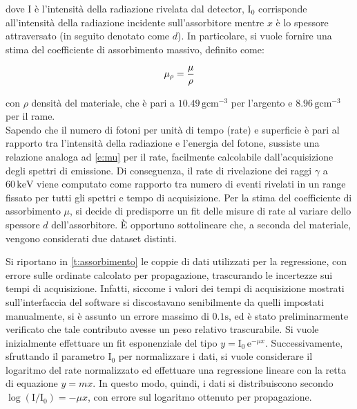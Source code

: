 \documentclass[twocolumn,10pt]{asme2ej}
\begin{document}
\noindent dove I è l'intensità della radiazione rivelata dal detector, $\text{I}_0$ corrisponde all'intensità della
radiazione incidente sull'assorbitore mentre $x$ è lo spessore attraversato (in seguito denotato come $d$). In
particolare, si vuole fornire una stima del coefficiente di assorbimento massivo, definito come:

\vspace{-15pt}
\begin{equation}
   \mu_{\rho} = \frac{\mu}{\rho}
    \vspace{-5pt}
    \label{e:mu_mass}
\end{equation}

con $\rho$ densità del materiale, che è pari a $10.49\,\si{\gram \centi\metre^{-3}}$ per l'argento e $8.96\,\si{\gram
\centi\metre^{-3}}$ per il rame. \\ 



Sapendo che il numero di fotoni per unità di tempo (rate) e superficie è pari al rapporto tra l'intensità della
radiazione e l'energia del fotone, sussiste una relazione analoga ad \autoref{e:mu} per il rate, facilmente calcolabile
dall'acquisizione degli spettri di emissione. Di conseguenza, il rate di rivelazione dei raggi $\gamma$ a
$60\,\si{\kilo\electronvolt}$ viene computato come rapporto tra numero di eventi rivelati in un range fissato per tutti
gli spettri e tempo di acquisizione. Per la stima del coefficiente di assorbimento $\mu$, si decide di predisporre un
fit delle misure di rate al variare dello spessore $d$ dell'assorbitore. È opportuno sottolineare che, a seconda del
materiale, vengono considerati due dataset distinti. 


Si riportano in \autoref{t:assorbimento} le coppie di dati utilizzati per la regressione, con errore sulle ordinate
calcolato per propagazione, trascurando le incertezze sui tempi di acquisizione. Infatti, siccome i valori dei tempi di
acquisizione mostrati sull'interfaccia del software si discostavano senibilmente da quelli impostati manualmente, si è
assunto un errore massimo di $0.1\si{\second}$, ed è stato preliminarmente verificato che tale contributo avesse un peso
relativo trascurabile. Si vuole inizialmente effettuare un fit esponenziale del tipo $y = \text{I}_0\,\text{e}^{-\mu
x}$. Successivamente, sfruttando il parametro $\text{I}_0$ per normalizzare i dati, si vuole considerare il logaritmo
del rate normalizzato ed effettuare una regressione lineare con la retta di equazione $y = mx$.  In questo modo, quindi,
i dati si distribuiscono secondo $\log(\text{I}/\text{I}_0)=-\mu x$, con errore sul logaritmo ottenuto per propagazione.
\end{document}

